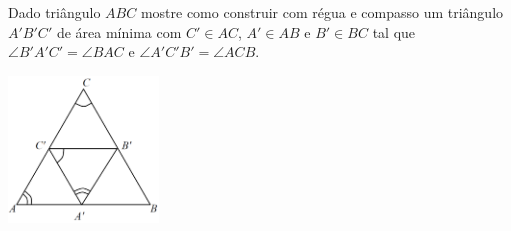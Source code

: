 Dado triângulo $ABC$ mostre como construir com régua e compasso um triângulo $A'B'C'$ de área
mínima com $C' \in AC$, $A' \in AB$ e $B' \in BC$ tal que $\angle B'A'C' = \angle BAC$ e $\angle A'C'B' = \angle AC B$.

\begin{center}
\includegraphics[width = 4cm]{figura.png}
\end{center}